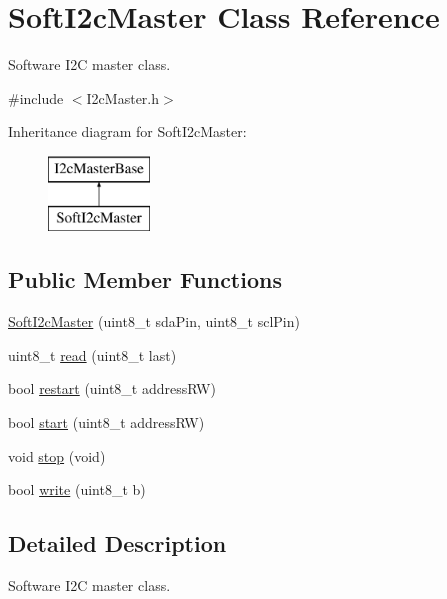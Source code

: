 \hypertarget{class_soft_i2c_master}{}\section{Soft\+I2c\+Master Class Reference}
\label{class_soft_i2c_master}


Software I2\+C master class.  




{\ttfamily \#include $<$I2c\+Master.\+h$>$}

Inheritance diagram for Soft\+I2c\+Master\+:\begin{figure}[H]
\begin{center}
\leavevmode
\includegraphics[height=2.000000cm]{class_soft_i2c_master}
\end{center}
\end{figure}
\subsection*{Public Member Functions}
\begin{DoxyCompactItemize}
\item 
\hyperlink{class_soft_i2c_master_a1e583d6f81bc43e403d315f05702919a}{Soft\+I2c\+Master} (uint8\+\_\+t sda\+Pin, uint8\+\_\+t scl\+Pin)
\item 
uint8\+\_\+t \hyperlink{class_soft_i2c_master_a56993378a66a702113eef640d8c82ea9}{read} (uint8\+\_\+t last)
\item 
bool \hyperlink{class_soft_i2c_master_a4ec0db661a654943888df023b233bcc5}{restart} (uint8\+\_\+t address\+R\+W)
\item 
bool \hyperlink{class_soft_i2c_master_a66a6298702caed4f52537ef372307699}{start} (uint8\+\_\+t address\+R\+W)
\item 
void \hyperlink{class_soft_i2c_master_ad8f52e1cbf15894472881afe439afa02}{stop} (void)
\item 
bool \hyperlink{class_soft_i2c_master_abcce5d83ae63dc61c2662be4a934d083}{write} (uint8\+\_\+t b)
\end{DoxyCompactItemize}


\subsection{Detailed Description}
Software I2\+C master class. 

